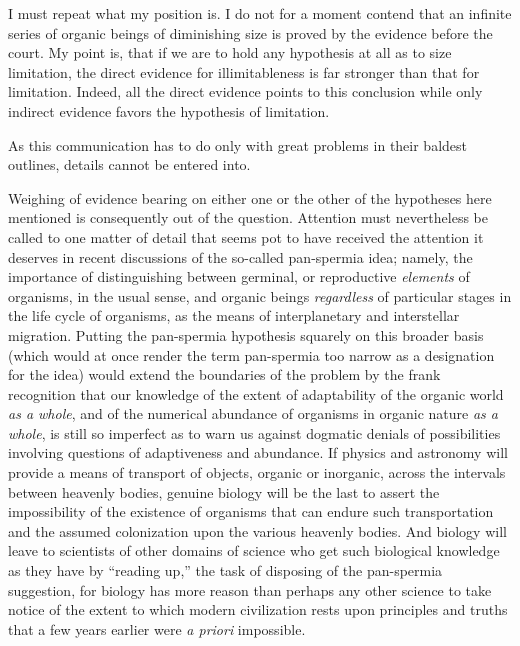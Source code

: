 \documentclass[a4paper, 11pt, oneside, polutonikogreek, english, landscape]{article}
\begin{document}
I must repeat what my position is. I do not for a moment contend that an infinite series of organic beings of diminishing size is proved by the evidence before the court. My point is, that if we are to hold any hypothesis at all as to size limitation, the direct evidence for illimitableness is far stronger than that for limitation. Indeed, all the direct evidence points to this conclusion while only indirect evidence favors the hypothesis of limitation.

As this communication has to do only with great problems in their baldest outlines, details cannot be entered into.

Weighing of evidence bearing on either one or the other of the hypotheses here mentioned is consequently out of the question. Attention must nevertheless be called to one matter of detail that seems pot to have received the attention it deserves in recent discussions of the so-called pan-spermia idea; namely, the importance of distinguishing between germinal, or reproductive \emph{elements} of organisms, in the usual sense, and organic beings \emph{regardless} of particular stages in the life cycle of organisms, as the means of interplanetary and interstellar migration. Putting the pan-spermia hypothesis squarely on this broader basis (which would at once render the term pan-spermia too narrow as a designation for the idea) would extend the boundaries of the problem by the frank recognition that our knowledge of the extent of adaptability of the organic world \emph{as a whole}, and of the numerical abundance of organisms in organic nature \emph{as a whole}, is still so imperfect as to warn us against dogmatic denials of possibilities involving questions of adaptiveness and abundance. If physics and astronomy will provide a means of transport of objects, organic or inorganic, across the intervals between heavenly bodies, genuine biology will be the last to assert the impossibility of the existence of organisms that can endure such transportation and the assumed colonization upon the various heavenly bodies. And biology will leave to scientists of other domains of science who get such biological knowledge as they have by ``reading up,'' the task of disposing of the pan-spermia suggestion, for biology has more reason than perhaps any other science to take notice of the extent to which modern civilization rests upon principles and truths that a few years earlier were \emph{a priori} impossible.

\subsection{}
\end{document}
